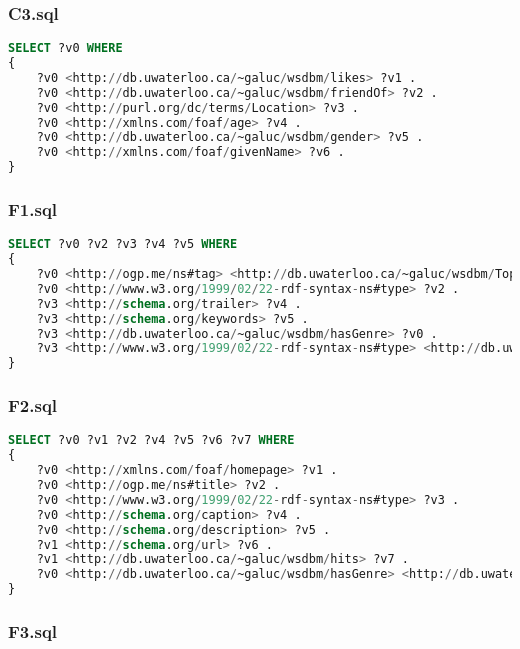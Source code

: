 \documentclass[titlepage, a4paper, 12pt] {article}
\begin{document}
\subsubsection{C3.sql}

\begin{lstlisting}[language=SQL] 
SELECT ?v0 WHERE 
{
	?v0 <http://db.uwaterloo.ca/~galuc/wsdbm/likes> ?v1 .
	?v0 <http://db.uwaterloo.ca/~galuc/wsdbm/friendOf> ?v2 .
	?v0 <http://purl.org/dc/terms/Location> ?v3 .
	?v0 <http://xmlns.com/foaf/age> ?v4 .
	?v0 <http://db.uwaterloo.ca/~galuc/wsdbm/gender> ?v5 .
	?v0 <http://xmlns.com/foaf/givenName> ?v6 .
}
\end{lstlisting}

\subsubsection{F1.sql}

\begin{lstlisting}[language=SQL] 
SELECT ?v0 ?v2 ?v3 ?v4 ?v5 WHERE 
{
	?v0 <http://ogp.me/ns#tag> <http://db.uwaterloo.ca/~galuc/wsdbm/Topic103> .
	?v0 <http://www.w3.org/1999/02/22-rdf-syntax-ns#type> ?v2 .
	?v3 <http://schema.org/trailer> ?v4 .
	?v3 <http://schema.org/keywords> ?v5 .
	?v3 <http://db.uwaterloo.ca/~galuc/wsdbm/hasGenre> ?v0 .
	?v3 <http://www.w3.org/1999/02/22-rdf-syntax-ns#type> <http://db.uwaterloo.ca/~galuc/wsdbm/ProductCategory2> .
}
\end{lstlisting}

\subsubsection{F2.sql}

\begin{lstlisting}[language=SQL] 
SELECT ?v0 ?v1 ?v2 ?v4 ?v5 ?v6 ?v7 WHERE 
{
	?v0 <http://xmlns.com/foaf/homepage> ?v1 .
	?v0 <http://ogp.me/ns#title> ?v2 .
	?v0 <http://www.w3.org/1999/02/22-rdf-syntax-ns#type> ?v3 .
	?v0 <http://schema.org/caption> ?v4 .
	?v0 <http://schema.org/description> ?v5 .
	?v1 <http://schema.org/url> ?v6 .
	?v1 <http://db.uwaterloo.ca/~galuc/wsdbm/hits> ?v7 .
	?v0 <http://db.uwaterloo.ca/~galuc/wsdbm/hasGenre> <http://db.uwaterloo.ca/~galuc/wsdbm/SubGenre35> .
}
\end{lstlisting}

\subsubsection{F3.sql}
\end{document}
